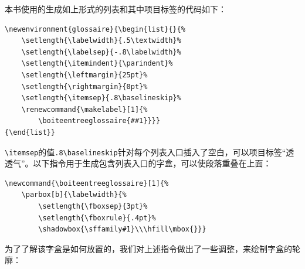 本书使用的生成如上形式的列表和其中项目标签的代码如下：

\begin{dmd}
\begin{verbatim}
\newenvironment{glossaire}{\begin{list}{}{%
    \setlength{\labelwidth}{.5\textwidth}% 
    \setlength{\labelsep}{-.8\labelwidth}% 
    \setlength{\itemindent}{\parindent}% 
    \setlength{\leftmargin}{25pt}% 
    \setlength{\rightmargin}{0pt}%
    \setlength{\itemsep}{.8\baselineskip}% 
    \renewcommand{\makelabel}[1]{%
        \boiteentreeglossaire{##1}}}}
{\end{list}}\end{verbatim}
\end{dmd}

\verb|\itemsep|的值\verb|.8\baselineskip|针对每个列表入口插入了空白，可以项目标签“透透气”。以下指令用于生成包含列表入口的字盒，可以使段落重叠在上面：

\begin{dmd}
\begin{verbatim}
\newcommand{\boiteentreeglossaire}[1]{% 
    \parbox[b]{\labelwidth}{%
        \setlength{\fboxsep}{3pt}% 
        \setlength{\fboxrule}{.4pt}% 
        \shadowbox{\sffamily#1}\\\hfill\mbox{}}}\end{verbatim}
\end{dmd}

为了了解该字盒是如何放置的，我们对上述指令做出了一些调整，来绘制字盒的轮廓：

\renewcommand{\boiteentreeglossaire}[1]{%
    \parbox[b]{\labelwidth}{%
        \setlength{\fboxsep}{3pt}%
        \setlength{\fboxrule}{.4pt}%
        \shadowbox{\sffamily#1}\\\hfill\mbox{}}}

        \newenvironment{leglossaire}{%
        \begin{list}{}{%
            \setlength{\labelwidth}{.5\textwidth}%
            \setlength{\labelsep}{-.8\labelwidth}%
            \setlength{\itemindent}{\parindent}%
            \setlength{\leftmargin}{25pt}%
            \setlength{\rightmargin}{0pt}%
            \setlength{\itemsep}{.8\baselineskip}%
            \renewcommand{\makelabel}[1]{\boiteentreeglossaire{##1}}
          }
        }
      {\end{list}}

\newcommand{\fboiteentreeglossaire}[1]{%
      \setlength{\fboxsep}{-1pt}%
      \setlength{\fboxrule}{1pt}%
      \fbox{\parbox[b]{\labelwidth}{%
        \setlength{\fboxsep}{3pt}%
        \setlength{\fboxrule}{.4pt}%
        \shadowbox{\sffamily#1}\\\hfill\mbox{}%
      }}%
    }

